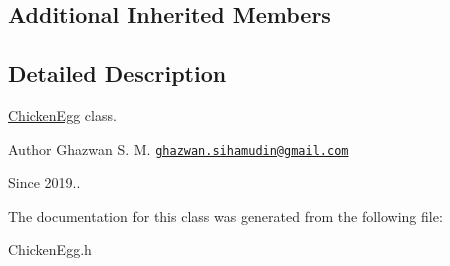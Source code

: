\subsection*{Additional Inherited Members}


\subsection{Detailed Description}
\hyperlink{classChickenEgg}{Chicken\+Egg} class.

\begin{DoxyAuthor}{Author}
Ghazwan S. M. \href{mailto:ghazwan.sihamudin@gmail.com}{\tt ghazwan.\+sihamudin@gmail.\+com} 
\end{DoxyAuthor}
\begin{DoxySince}{Since}
2019.. 
\end{DoxySince}


The documentation for this class was generated from the following file\+:\begin{DoxyCompactItemize}
\item 
Chicken\+Egg.\+h\end{DoxyCompactItemize}
